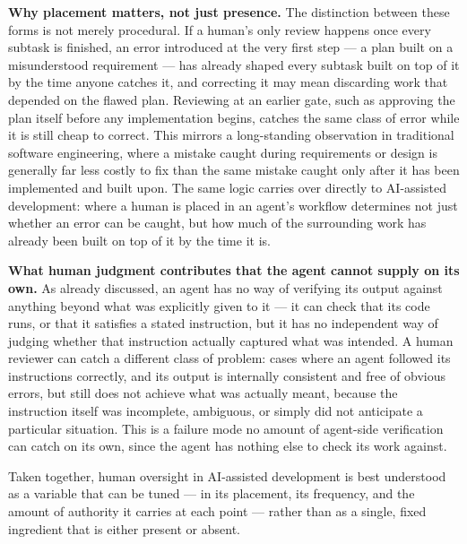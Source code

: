\textbf{Why placement matters, not just presence.} The distinction between these forms is not merely procedural. If a human's only review happens once every subtask is finished, an error introduced at the very first step --- a plan built on a misunderstood requirement --- has already shaped every subtask built on top of it by the time anyone catches it, and correcting it may mean discarding work that depended on the flawed plan. Reviewing at an earlier gate, such as approving the plan itself before any implementation begins, catches the same class of error while it is still cheap to correct. This mirrors a long-standing observation in traditional software engineering, where a mistake caught during requirements or design is generally far less costly to fix than the same mistake caught only after it has been implemented and built upon. The same logic carries over directly to AI-assisted development: where a human is placed in an agent's workflow determines not just whether an error can be caught, but how much of the surrounding work has already been built on top of it by the time it is.

\textbf{What human judgment contributes that the agent cannot supply on its own.} As already discussed, an agent has no way of verifying its output against anything beyond what was explicitly given to it --- it can check that its code runs, or that it satisfies a stated instruction, but it has no independent way of judging whether that instruction actually captured what was intended. A human reviewer can catch a different class of problem: cases where an agent followed its instructions correctly, and its output is internally consistent and free of obvious errors, but still does not achieve what was actually meant, because the instruction itself was incomplete, ambiguous, or simply did not anticipate a particular situation. This is a failure mode no amount of agent-side verification can catch on its own, since the agent has nothing else to check its work against.

Taken together, human oversight in AI-assisted development is best understood as a variable that can be tuned --- in its placement, its frequency, and the amount of authority it carries at each point --- rather than as a single, fixed ingredient that is either present or absent.

